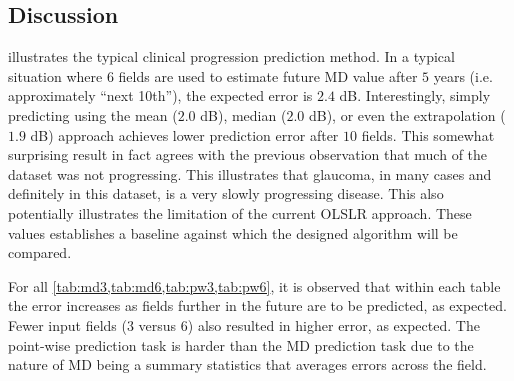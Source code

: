 \subsection{Discussion}

 illustrates the typical clinical progression prediction method. In a typical situation where $6$ fields are used to estimate future MD value after $5$ years (i.e. approximately ``next 10th''), the expected error is $2.4$ dB. Interestingly, simply predicting using the mean ($2.0$ dB), median ($2.0$ dB), or even the extrapolation ($1.9$ dB) approach achieves lower prediction error after $10$ fields. This somewhat surprising result in fact agrees with the previous observation that much of the dataset was not progressing. This illustrates that glaucoma, in many cases and definitely in this dataset, is a very slowly progressing disease. This also potentially illustrates the limitation of the current \ac{OLSLR} approach. These values establishes a baseline against which the designed algorithm will be compared. 

For all \cref{tab:md3,tab:md6,tab:pw3,tab:pw6}, it is observed that within each table the error increases as fields further in the future are to be predicted, as expected. Fewer input fields ($3$ versus $6$) also resulted in higher error, as expected. The point-wise prediction task is harder than the MD prediction task due to the nature of MD being a summary statistics that averages errors across the field. 



